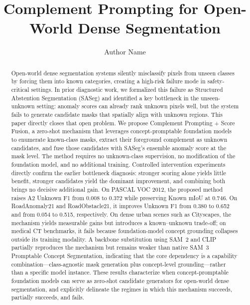 \documentclass[a4paper,fleqn]{cas-dc}
\newcommand{\method}{Complement Prompting + Score Fusion}
\newcommand{\samthree}{SAM~3}
\newcommand{\samtwo}{SAM~2}
\newcommand{\clip}{CLIP}
\begin{document}
\let\WriteBookmarks\relax
\renewcommand{\topfraction}{0.95}
\renewcommand{\dbltopfraction}{0.95}
\renewcommand{\bottomfraction}{0.85}
\renewcommand{\textfraction}{0.05}
\renewcommand{\floatpagefraction}{0.75}
\renewcommand{\dblfloatpagefraction}{0.75}
\setcounter{topnumber}{3}
\setcounter{bottomnumber}{2}
\setcounter{totalnumber}{5}
\setcounter{dbltopnumber}{2}


\title[mode=title]{Complement Prompting for Open-World Dense Segmentation}

\author[1]{Author Name}

\begin{abstract}
Open-world dense segmentation systems silently misclassify pixels from unseen classes by forcing them into known categories, creating a high-risk failure mode in safety-critical settings. In prior diagnostic work, we formalized this failure as Structured Abstention Segmentation (SASeg) and identified a key bottleneck in the unseen-unknown setting: anomaly scores can already rank unknown pixels well, but the system fails to generate candidate masks that spatially align with unknown regions. This paper directly closes that open problem. We propose \method, a zero-shot mechanism that leverages concept-promptable foundation models to enumerate known-class masks, extract their foreground complement as unknown candidates, and fuse those candidates with SASeg's ensemble anomaly score at the mask level. The method requires no unknown-class supervision, no modification of the foundation model, and no additional training. Controlled intervention experiments directly confirm the earlier bottleneck diagnosis: stronger scoring alone yields little benefit, stronger candidates yield the dominant improvement, and combining both brings no decisive additional gain. On PASCAL VOC 2012, the proposed method raises A2 Unknown F1 from 0.008 to 0.372 while preserving Known mIoU at 0.746. On RoadAnomaly21 and RoadObstacle21, it improves Unknown F1 from 0.380 to 0.652 and from 0.054 to 0.515, respectively. On dense urban scenes such as Cityscapes, the mechanism yields measurable gains but introduces a known--unknown trade-off; on medical CT benchmarks, it fails because foundation-model concept grounding collapses outside its training modality. A backbone substitution using \samtwo{} and \clip{} partially reproduces the mechanism but remains weaker than native \samthree{} Promptable Concept Segmentation, indicating that the core dependency is a capability combination---class-agnostic mask generation plus concept-level grounding---rather than a specific model instance. These results characterize when concept-promptable foundation models can serve as zero-shot candidate generators for open-world dense segmentation, and explicitly delineate the regimes in which this mechanism succeeds, partially succeeds, and fails.
\end{abstract}
\end{document}
